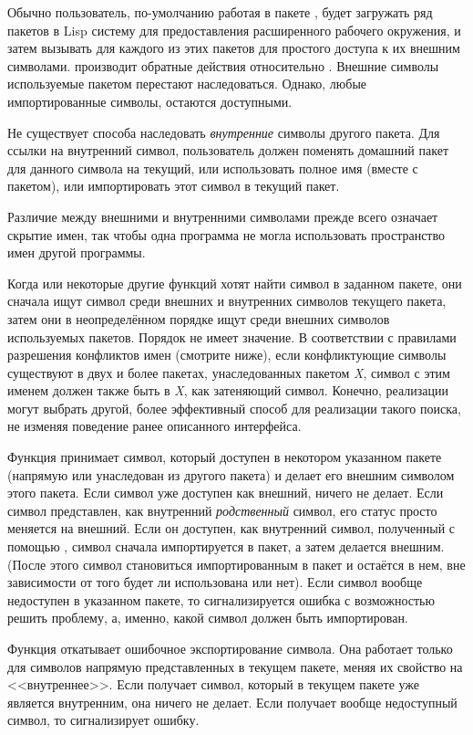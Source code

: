 Обычно пользователь, по-умолчанию работая в пакете , будет
загружать 
ряд пакетов в Lisp систему для предоставления расширенного рабочего окружения, и
затем вызывать  для каждого из этих пакетов для простого
доступа к их внешним символами.
 производит обратные действия относительно
. Внешние символы используемые пакетом перестают
наследоваться. Однако, любые импортированные символы, остаются доступными.

Не существует способа наследовать \emph{внутренние} символы другого пакета. Для
ссылки на внутренний символ, пользователь должен поменять домашний пакет для
данного символа на текущий, или использовать полное имя (вместе с пакетом), или
импортировать этот символ в текущий пакет.

Различие между внешними и внутренними символами прежде всего означает скрытие
имен, так чтобы одна программа не могла использовать пространство имен другой
программы.

Когда  или некоторые другие функций хотят найти символ в заданном
пакете, они сначала ищут символ среди внешних и внутренних символов текущего
пакета, затем они в неопределённом порядке ищут среди внешних символов
используемых пакетов. Порядок не имеет значение. В соответствии с правилами
разрешения конфликтов имен (смотрите ниже), если конфликтующие символы существуют
в двух и более пакетах, унаследованных пакетом \emph{X}, символ с этим именем
должен также быть в \emph{X}, как затеняющий символ. Конечно, реализации могут
выбрать другой, более эффективный способ для реализации такого поиска, не
изменяя поведение ранее описанного интерфейса.

Функция  принимает символ, который доступен в некотором указанном
пакете (напрямую или унаследован из другого пакета) и делает его внешним символом
этого пакета. Если символ уже доступен как внешний,  ничего не
делает. Если символ представлен, как внутренний \emph{родственный} символ, его
статус просто меняется на внешний. Если он доступен, как внутренний символ,
полученный с помощью , символ сначала импортируется в пакет, а
затем делается внешним. (После этого символ становиться импортированным в пакет
и остаётся в нем, вне зависимости от того будет ли использована
 или нет). Если символ вообще недоступен в указанном пакете,
то сигнализируется ошибка с возможностью решить проблему, а, именно, какой
символ должен быть импортирован.

Функция  откатывает ошибочное экспортирование символа. Она
работает только для символов напрямую 
представленных в текущем пакете, меняя их свойство на <<внутреннее>>.
Если  получает символ, который в текущем пакете уже является
внутренним, она ничего не делает. Если получает вообще недоступный символ, то
сигнализирует ошибку.

